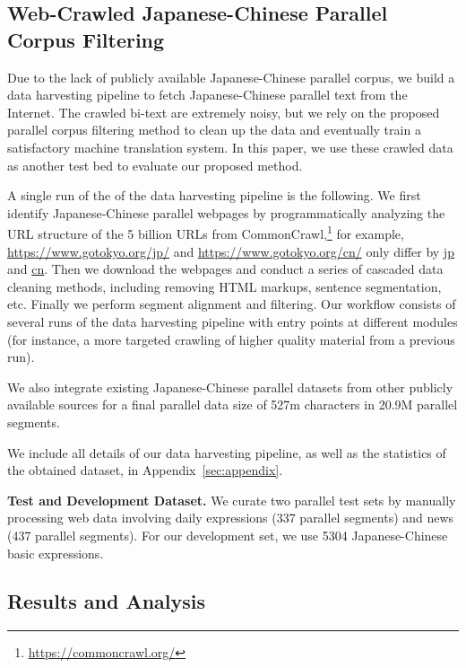 \documentclass[11pt,a4paper]{article}
\begin{document}
\subsection{Web-Crawled Japanese-Chinese Parallel Corpus Filtering}

Due to the lack of publicly available Japanese-Chinese parallel corpus, we build a data harvesting pipeline to fetch Japanese-Chinese parallel text from the Internet. The crawled bi-text are extremely noisy, but we rely on the proposed parallel corpus filtering method to clean up the data and eventually train a satisfactory machine translation system. In this paper, we use these crawled data as another test bed to evaluate our proposed method.

A single run of the 
of the data harvesting pipeline is the following. We first identify Japanese-Chinese parallel webpages by programmatically analyzing the URL structure of the 5 billion URLs from CommonCrawl,\footnote{\url{https://commoncrawl.org/}} for example, \url{https://www.gotokyo.org/jp/} and \url{https://www.gotokyo.org/cn/} only differ by \url{jp} and \url{cn}. Then we download the webpages and conduct a series of cascaded data cleaning methods, including removing HTML markups, sentence segmentation, etc. Finally we perform segment alignment and filtering. 
Our workflow consists of several runs of the data harvesting pipeline with entry points at different modules (for instance, a more targeted crawling of higher quality material from a previous run). 







We also integrate existing Japanese-Chinese parallel datasets from other publicly available sources for a final parallel data size of 527m characters in 20.9M parallel segments. 


We include all details of our data harvesting pipeline, as well as the statistics of the obtained dataset, in Appendix~\ref{sec:appendix}.




\textbf{Test and Development Dataset.} 
We curate two  parallel test sets by manually processing web data involving daily expressions (337 parallel segments) and news (437 parallel segments). For our development set, we use 5304 Japanese-Chinese basic expressions.

\subsection{Results and Analysis}
\end{document}
